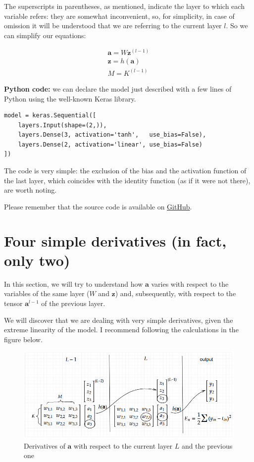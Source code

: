 \documentclass{article}
\begin{document}
The superscripts in parentheses, as mentioned, indicate the layer to which each variable refers: they are somewhat inconvenient, so, for simplicity, in case of omission it will be understood that we are referring to the current layer $\displaystyle l$. So we can simplify our equations:

\begin{gather*}
\mathbf{a} =W\mathbf{z}^{( l-1)}\\
\mathbf{z} =h(\mathbf{a})\\
M=K^{( l-1)} \
\end{gather*}

\textbf{Python code:} we can declare the model just described with a few lines of Python using the well-known Keras library.

\begin{tcolorbox}[colback=gray!10, colframe=gray!50, title=Model definition]
\begin{verbatim}
model = keras.Sequential([
    layers.Input(shape=(2,)),
    layers.Dense(3, activation='tanh',   use_bias=False),
    layers.Dense(2, activation='linear', use_bias=False)
])
\end{verbatim}
    \end{tcolorbox}


The code is very simple: the exclusion of the bias and the activation function of the last layer, which coincides with the identity function (as if it were not there), are worth noting.

Please remember that the source code is available on \href{https://github.com/nicolinux72/backpropagation.git}{GitHub}.

\section{Four simple derivatives (in fact, only two)}

In this section, we will try to understand how $\boldsymbol{a}$ varies with respect to the variables of the same layer ($W$ and $\boldsymbol{z}$) and, subsequently, with respect to the tensor $\boldsymbol{a}^{l-1}$ of the previous layer.

We will discover that we are dealing with very simple derivatives, given the extreme linearity of the model. I recommend following the calculations in the figure below.

\begin{figure}[H]
    \centering
    \includegraphics[width=0.8\linewidth]{images/last-layers details.png}
    \caption{Derivatives of $\boldsymbol{a}$ with respect to the current layer $L$ and the previous one}
    \label{fig:last-details}
\end{figure}
\end{document}
